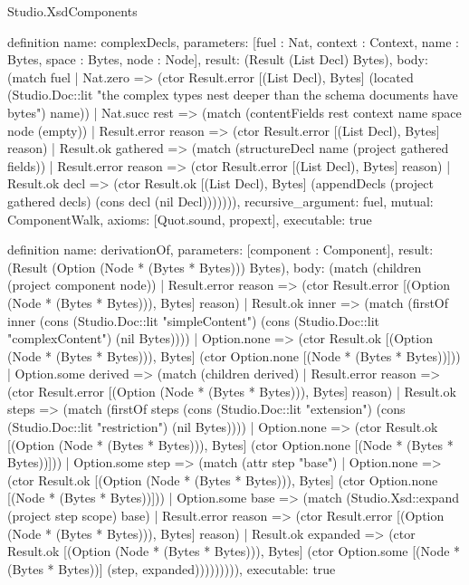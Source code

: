 \begin{lexlean}{Studio.XsdComponents}
\begin{semanticmodule}
definition{
  name: complexDecls,
  parameters: [fuel : Nat, context : Context, name : Bytes, space : Bytes, node : Node],
  result: (Result (List Decl) Bytes),
  body: (match fuel
    | Nat.zero => (ctor Result.error [(List Decl), Bytes] (located (Studio.Doc::lit "the complex types nest deeper than the schema documents have bytes") name))
    | Nat.succ rest => (match (contentFields rest context name space node (empty))
      | Result.error reason => (ctor Result.error [(List Decl), Bytes] reason)
      | Result.ok gathered => (match (structureDecl name (project gathered fields))
        | Result.error reason => (ctor Result.error [(List Decl), Bytes] reason)
        | Result.ok decl => (ctor Result.ok [(List Decl), Bytes] (appendDecls (project gathered decls) (cons decl (nil Decl))))))),
  recursive_argument: fuel,
  mutual: ComponentWalk,
  axioms: [Quot.sound, propext],
  executable: true
}

definition{
  name: derivationOf,
  parameters: [component : Component],
  result: (Result (Option (Node * (Bytes * Bytes))) Bytes),
  body: (match (children (project component node))
    | Result.error reason => (ctor Result.error [(Option (Node * (Bytes * Bytes))), Bytes] reason)
    | Result.ok inner => (match (firstOf inner (cons (Studio.Doc::lit "simpleContent") (cons (Studio.Doc::lit "complexContent") (nil Bytes))))
      | Option.none => (ctor Result.ok [(Option (Node * (Bytes * Bytes))), Bytes] (ctor Option.none [(Node * (Bytes * Bytes))]))
      | Option.some derived => (match (children derived)
        | Result.error reason => (ctor Result.error [(Option (Node * (Bytes * Bytes))), Bytes] reason)
        | Result.ok steps => (match (firstOf steps (cons (Studio.Doc::lit "extension") (cons (Studio.Doc::lit "restriction") (nil Bytes))))
          | Option.none => (ctor Result.ok [(Option (Node * (Bytes * Bytes))), Bytes] (ctor Option.none [(Node * (Bytes * Bytes))]))
          | Option.some step => (match (attr step "base")
            | Option.none => (ctor Result.ok [(Option (Node * (Bytes * Bytes))), Bytes] (ctor Option.none [(Node * (Bytes * Bytes))]))
            | Option.some base => (match (Studio.Xsd::expand (project step scope) base)
              | Result.error reason => (ctor Result.error [(Option (Node * (Bytes * Bytes))), Bytes] reason)
              | Result.ok expanded => (ctor Result.ok [(Option (Node * (Bytes * Bytes))), Bytes] (ctor Option.some [(Node * (Bytes * Bytes))] (step, expanded))))))))),
  executable: true
}


\end{semanticmodule}
\end{lexlean}
